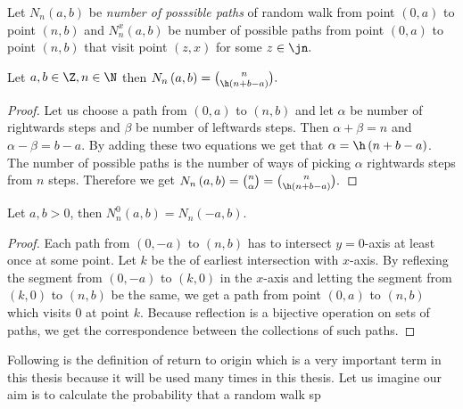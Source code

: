 \begin{defn}\label{defn-number_possible_paths}
 Let $N_n \left( a,b \right) $ be \emph{number of posssible paths} of random walk \rw from point $ \left( 0,a \right) $ to point $ \left( n,b \right)$
 and $N_n^x \left( a,b \right) $ be number of possible paths from point $ \left( 0,a \right) $ to point $\left( n,b \right)$
 that visit point $\left(z,x\right)$ for some $z \in \jn.$
\end{defn}
\begin{thm}\label{thm-number_of_possible_paths}
 Let $a,b \in \Z, n \in \N$ then $N_n \left( a,b \right) =\binom{n}{\h \left(n+b-a \right)}.$
\end{thm}
\begin{proof}
 Let us choose a path from $ \left( 0,a \right) $ to $ \left( n,b \right) $ and let $\alpha$ be number of rightwards steps and $\beta$ be number of leftwards steps.
 Then $\alpha+\beta=n$ and $\alpha-\beta=b-a$. By adding these two equations we get that $\alpha=\h \left( n+b-a \right) $.
 The number of possible paths is the number of ways of picking $\alpha$ rightwards steps from $n$ steps.
 Therefore we get $N_n \left( a,b \right) =\binom{n}{\alpha}=\binom{n}{\h \left( n+b-a \right) }.$
\end{proof}

\begin{thm}\label{thm-reflection_principle}
 Let $a,b >0$, then $N_n^0 \left( a,b \right) =N_n \left( -a,b \right) $.
\end{thm}
\begin{proof}
 Each path from $ \left( 0,-a \right) $ to $ \left( n,b \right) $ has to intersect $y=0$-axis at least once at some point.
 Let $k$ be the \Time of earliest intersection with $x$-axis. By reflexing the segment from $\left( 0,-a \right)$ to $\left( k,0 \right)$ in the $x$-axis and letting the segment from $\left(k,0\right)$ to $\left(n,b\right)$ be the same,
 we get a path from point $\left( 0,a \right)$ to $ \left(n,b\right)$ which visits $0$ at point $k$.
 Because reflection is a bijective operation on sets of paths, we get the correspondence between the collections of such paths.
\end{proof}

\begin{rem}
  Following is the definition of return to origin which is a very important term in this thesis because it will be used many times in this thesis. Let us imagine our aim is to calculate the probability that a random walk sp
\end{rem}

